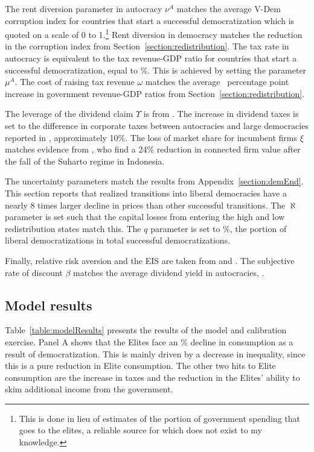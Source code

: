 The rent diversion parameter in autocracy $\nu^A$ matches the average V-Dem corruption index for countries that start a successful democratization which is quoted on a scale of 0 to 1.\footnote{This is done in lieu of estimates of the portion of government spending that goes to the elites, a reliable source for which does not exist to my knowledge.} Rent diversion in democracy matches the reduction in the corruption index from Section~\ref{section:redistribution}. The tax rate in autocracy is equivalent to the tax revenue-GDP ratio for countries that start a successful democratization, equal to \autocracyTax\%. This is achieved by setting the parameter $\mu^A$. The cost of raising tax revenue $\omega$ matches the average \tabEightOneCE\ percentage point increase in government revenue-GDP ratios from Section~\ref{section:redistribution}.

The leverage of the dividend claim $\Upsilon$ is from \cite{Wachter2013}. The increase in dividend taxes is set to the difference in corporate taxes between autocracies and large democracies reported in \cite*{Genschel2016}, approximately 10\%. The loss of market share for incumbent firms $\xi$ matches evidence from \cite{Fisman2001}, who find a 24\% reduction in connected firm value after the fall of the Suharto regime in Indonesia.

The uncertainty parameters match the results from Appendix~\ref{section:demEnd}. This section reports that realized transitions into liberal democracies have a nearly 8 times larger decline in prices than other successful transitions. The $\aleph$ parameter is set such that the capital losses from entering the high and low redistribution states match this. The $q$ parameter is set to  \pctLibDem\%, the portion of liberal democratizations in total successful democratizations.

Finally, relative risk aversion and the EIS are taken from \cite{Catherine2021} and \cite*{Bansal2010}. The subjective rate of discount $\beta$ matches the average dividend yield in autocracies, \tabTwelveDivYldAutData.

\subsection{Model results}
\label{section:model_results}
Table~\ref{table:modelResults} presents the results of the model and calibration exercise. Panel A shows that the Elites face an \tabTwelveEliteConsDrop\% decline in consumption as a result of democratization. This is mainly driven by a decrease in inequality, since this is a pure reduction in Elite consumption. The other two hits to Elite consumption are the increase in taxes and the reduction in the Elites' ability to skim additional income from the government.

